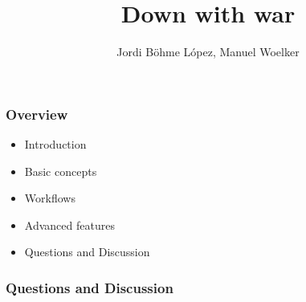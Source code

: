 \documentclass{beamer}
\author[Jordi Böhme López]{Jordi Böhme López, Manuel Woelker}
\title[git intro\hspace{2em}\insertframenumber/\inserttotalframenumber]{Down with war}
\begin{document}
\maketitle


\begin{frame}
  \frametitle{Overview}
  \begin{itemize}
  \item Introduction\pause
  \item Basic concepts\pause
  \item Workflows\pause
  \item Advanced features\pause
  \item Questions and Discussion
  \end{itemize}
\end{frame}



\begin{frame}
  \frametitle{Questions and Discussion}
\end{frame}
\end{document}

